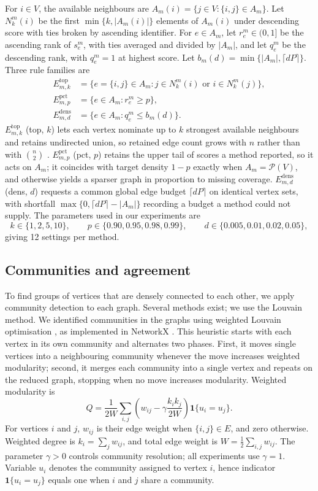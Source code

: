 \documentclass[11pt,a4paper]{article}
\begin{document}
For \(i\in V\), the available neighbours are \(A_m(i)=\{j\in V:\{i,j\}\in A_m\}\). Let \(N_k^m(i)\) be the
first \(\min\{k,\lvert A_m(i)\rvert\}\) elements of
\(A_m(i)\) under descending score with ties broken by ascending identifier. For
\(e\in A_m\), let \(r_e^m\in(0,1]\) be the ascending rank of \(s_e^m\), with ties
averaged and divided by \(\lvert A_m\rvert\), and let \(q_e^m\) be the descending rank,
with \(q_e^m=1\) at highest score. Let
\(b_m(d)=\min\{\lvert A_m\rvert,\lceil dP\rceil\}\). Three rule families are
\begin{align*}
E_{m,k}^{\mathrm{top}}
  &=\{e=\{i,j\}\in A_m:j\in N_k^m(i)\text{ or }i\in N_k^m(j)\},\\
E_{m,p}^{\mathrm{pct}}
  &=\{e\in A_m:r_e^m\geq p\},\\
E_{m,d}^{\mathrm{dens}}
  &=\{e\in A_m:q_e^m\leq b_m(d)\}.
\end{align*}
\(E_{m,k}^{\mathrm{top}}\) (top, \(k\)) lets each vertex nominate up to \(k\) strongest available neighbours
and retains undirected union, so retained edge count grows with \(n\) rather
than with \(\binom n2\) \citep{camoglu2006multiattribute}. \(E_{m,p}^{\mathrm{pct}}\) (pct, \(p\))
retains the upper tail of scores a method reported, so it acts on \(A_m\); it
coincides with target density \(1-p\) exactly when \(A_m=\mathcal P(V)\), and
otherwise yields a sparser graph in proportion to missing coverage. \(E_{m,d}^{\mathrm{dens}}\) (dens, \(d\)) requests a common global edge budget \(\lceil dP\rceil\) on
identical vertex sets, with shortfall
\(\max\{0,\lceil dP\rceil-\lvert A_m\rvert\}\) recording a budget a method
could not supply. The parameters used in our experiments are
\[
k\in\{1,2,5,10\},\qquad
p\in\{0.90,0.95,0.98,0.99\},\qquad
d\in\{0.005,0.01,0.02,0.05\},
\]
giving 12 settings per method.

\subsection{Communities and agreement}

To find groups of vertices that are densely connected to each other, we apply
community detection to each graph. Several methods exist; we use the Louvain
method. We identified communities in the graphs using weighted Louvain
optimisation \citep{blondel2008fast}, as implemented in NetworkX
\citep{hagberg2008exploring}. This heuristic starts with each vertex in its own
community and alternates two phases. First, it moves single vertices into a
neighbouring community whenever the move increases weighted modularity; second,
it merges each community into a single vertex and repeats on the reduced graph,
stopping when no move increases modularity. Weighted modularity is
\[
Q=\frac{1}{2W}\sum_{i,j}\left(w_{ij}-\gamma\frac{k_i k_j}{2W}\right)
\mathbf 1\{u_i=u_j\}.
\]
For vertices \(i\) and \(j\), \(w_{ij}\) is their edge weight when
\(\{i,j\}\in E\), and zero otherwise. Weighted degree is
\(k_i=\sum_j w_{ij}\), and total edge weight is
\(W=\frac12\sum_{i,j}w_{ij}\). The parameter \(\gamma>0\) controls community
resolution; all experiments use \(\gamma=1\). Variable \(u_i\) denotes the
community assigned to vertex \(i\), hence indicator \(\mathbf1\{u_i=u_j\}\) equals
one when \(i\) and \(j\) share a community.
\end{document}
